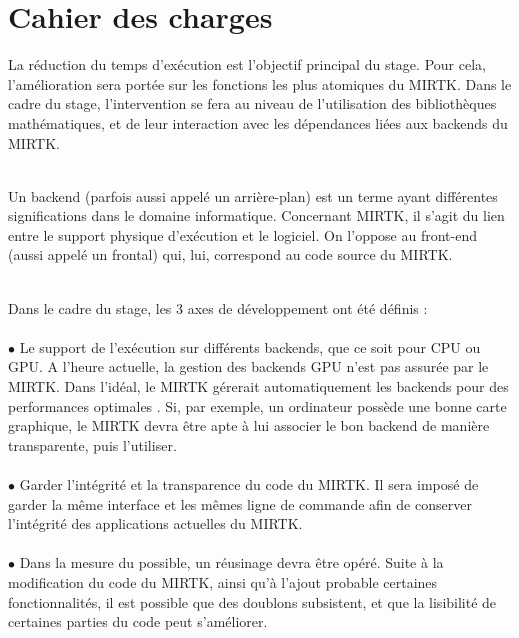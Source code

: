 \documentclass[10pt]{report}
\begin{document}
	\section{Cahier des charges}
	La réduction du temps d'exécution est l'objectif principal du stage. Pour cela, l'amélioration sera portée sur les fonctions les plus atomiques du MIRTK. Dans le cadre du stage, l'intervention se fera au niveau de l'utilisation des bibliothèques mathématiques, et de leur interaction avec les dépendances liées aux backends du MIRTK.\\ ~\par
	
	Un backend (parfois aussi appelé un arrière-plan) est un terme ayant différentes significations dans le domaine informatique. Concernant MIRTK, il s'agit du lien entre le support physique d'exécution et le logiciel. On l'oppose au front-end (aussi appelé un frontal) qui, lui, correspond au code source du MIRTK. \\ ~\par
	
	Dans le cadre du stage, les 3 axes de développement ont été définis : \\
	\\{$\bullet$} Le support de l'exécution sur différents backends, que ce soit pour CPU ou GPU. A l'heure actuelle, la gestion des backends GPU n'est pas assurée par le MIRTK. Dans l'idéal, le MIRTK gérerait automatiquement les backends  pour des performances optimales . Si, par exemple, un ordinateur possède une bonne carte graphique, le MIRTK devra être apte à lui associer le bon backend de manière transparente, puis l'utiliser.\\
	\\{$\bullet$} Garder l'intégrité et la transparence du code du MIRTK. Il sera imposé de garder la même interface et les mêmes ligne de commande afin de conserver l'intégrité des applications actuelles du MIRTK.  \\
	\\{$\bullet$} Dans la mesure du possible, un réusinage devra être opéré. Suite à la modification du code du MIRTK, ainsi qu'à l'ajout probable certaines fonctionnalités, il est possible que des doublons subsistent, et que la lisibilité de certaines parties du code peut s'améliorer.	
\end{document}
